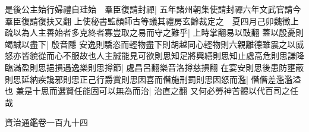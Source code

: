 是後公主始行婦禮自珪始　羣臣復請封禪|{
	五年諸州朝集使請封禪六年文武官請今羣臣復請復扶又翻}
上使秘書監顔師古等議其禮房玄齡裁定之　夏四月己卯魏徵上疏以為人主善始者多克終者寡豈取之易而守之難乎|{
	上時掌翻易以豉翻}
蓋以殷憂則竭誠以盡下|{
	殷音隱}
安逸則驕恣而輕物盡下則胡越同心輕物則六親離德雖震之以威怒亦皆貌從而心不服故也人主誠能見可欲則思知足將興繕則思知止處高危則思謙降臨滿盈則思挹損遇逸樂則思撙節|{
	處昌呂翻樂音洛撙慈損翻}
在宴安則思後患防壅蔽則思延納疾讒邪則思正己行爵賞則思因喜而僭施刑罰則思因怒而濫|{
	僭僭差濫濫溢也}
兼是十思而選賢任能固可以無為而治|{
	治直之翻}
又何必勞神苦體以代百司之任哉

資治通鑑卷一百九十四














































































































































